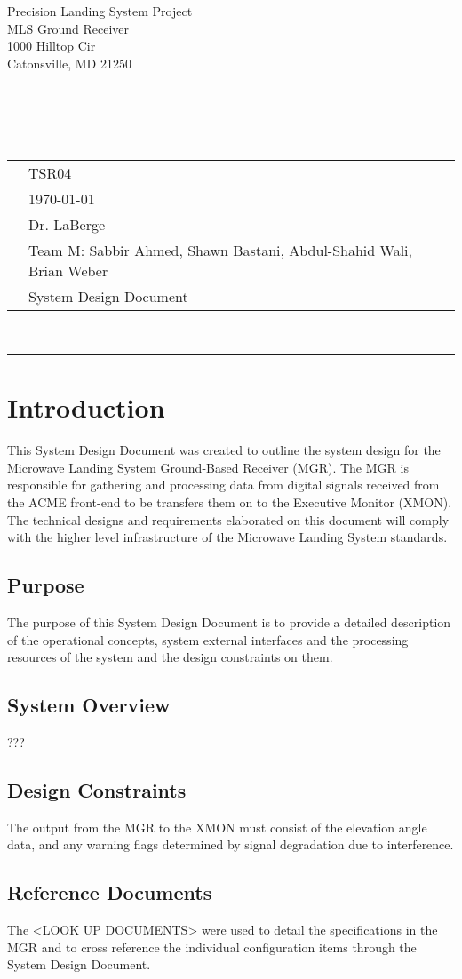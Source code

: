 \documentclass[11pt]{article}
\newcommand{\header}[5]{
    \begin{centering}
        \parbox{6.8in}{
        \begin{flushright}
        \begin{spacing}{.8}{
        \fontfamily{cmss}{\large{\textbf{#1}}\\}}
        \small{
            #2\\
            #3\\
            #4\\
            #5}\\
        \end{spacing}
        \end{flushright}
        \vspace{-7.5mm}
        }\\
        \rule{\textwidth}{0.5pt}\\
        \vspace{-4mm}
    \end{centering}
}
\newcommand{\documentinfo}[5]{
    \begin{centering}
        \parbox{6.8in}{
        \begin{spacing}{1}
            \begin{flushleft}
                \begin{tabular}{l l}
                    \fontfamily{cmss}{\textbf{DOC \#: }} & #1 \\
                    \fontfamily{cmss}{\textbf{DATE: }} & #2 \\
                    \fontfamily{cmss}{\textbf{TO: }} & #3 \\
                    \fontfamily{cmss}{\textbf{FROM: }} & #4 \\
                    \fontfamily{cmss}{\textbf{SUBJECT: }} & #5 \\
                \end{tabular}\\
                \rule{\textwidth}{1pt}
            \end{flushleft}
        \end{spacing}
        }
    \end{centering}
}
\begin{document}
    \header{CMPE349}{Precision Landing System Project}{MLS Ground Receiver}{1000 Hilltop Cir}{Catonsville, MD 21250}
    \documentinfo{TSR04}{\today}{Dr. LaBerge}{Team M: Sabbir Ahmed, Shawn Bastani, Abdul-Shahid Wali, Brian Weber}{System Design Document}

    \section{Introduction}
    This System Design Document was created to outline the system design for the Microwave Landing System Ground-Based Receiver (MGR). The MGR is responsible for gathering and processing data from digital signals received from the ACME front-end to be transfers them on to the Executive Monitor (XMON). The technical designs and requirements elaborated on this document will comply with the higher level infrastructure of the Microwave Landing System standards.

        \subsection{Purpose}
        The purpose of this System Design Document is to provide a detailed description of the operational concepts, system external interfaces and the processing resources of the system and the design constraints on them.

        \subsection{System Overview}
        ???

        \subsection{Design Constraints}
        The output from the MGR to the XMON must consist of the elevation angle data, and any warning flags determined by signal degradation due to interference.

        \subsection{Reference Documents}
        The <LOOK UP DOCUMENTS> were used to detail the specifications in the MGR and to cross reference the individual configuration items through the System Design Document.
\end{document}
